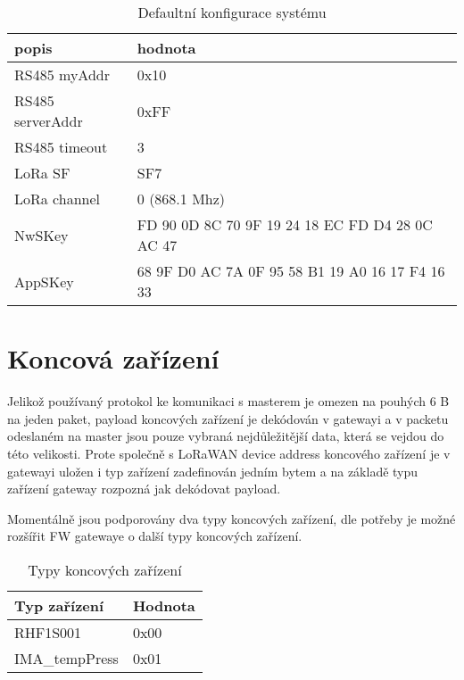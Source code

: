 \begin{table}[!h]
    \centering
    \begin{tabular}{ |l|l| }
     \hline

     popis              & hodnota         \\ \hline \hline
     RS485 myAddr       & 0x10            \\ \hline
     RS485 serverAddr   & 0xFF            \\ \hline
     RS485 timeout      & 3               \\ \hline
     LoRa SF            & SF7             \\ \hline
     LoRa channel       & 0 (868.1 Mhz)   \\ \hline
     NwSKey             & FD 90 0D 8C 70 9F 19 24 18 EC FD D4 28 0C AC 47  \\ \hline
     AppSKey            & 68 9F D0 AC 7A 0F 95 58 B1 19 A0 16 17 F4 16 33  \\ \hline

    \end{tabular}
    \caption{Defaultní konfigurace systému}
    \label{table:5}
\end{table}


\newpage
\section{Koncová zařízení}
Jelikož používaný protokol ke komunikaci s masterem je omezen na pouhých 6 B na jeden paket, payload koncových zařízení je dekódován v gatewayi a v packetu odeslaném na master jsou pouze vybraná nejdůležitější data, která se vejdou do této velikosti.
Prote společně s LoRaWAN device address koncového zařízení je v gatewayi uložen i typ zařízení zadefinován jedním bytem a na základě typu zařízení gateway rozpozná jak dekódovat payload.

Momentálně jsou podporovány dva typy koncových zařízení, dle potřeby je možné rozšířit FW gatewaye o další typy koncových zařízení.

\begin{table}[!h]
    \centering
    \begin{tabular}{ |l|l| }
     \hline

     Typ zařízení       & Hodnota         \\ \hline \hline
     RHF1S001           & 0x00            \\ \hline
     IMA\_tempPress     & 0x01            \\ \hline
     
    \end{tabular}
    \caption{Typy koncových zařízení}
    \label{table:TypyKoncZarizeni}
\end{table}


